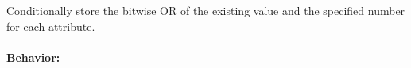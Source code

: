Conditionally store the bitwise OR of the existing value and the specified
number for each attribute.

\paragraph{Behavior:}
\begin{itemize}[noitemsep]


\end{itemize}
